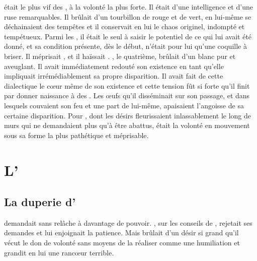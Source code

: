 \Ogo était le plus vif des \Dormus, à la volonté la plus forte. Il était d'une intelligence et d'une ruse remarquables. Il brûlait d'un tourbillon de rouge et de vert, en lui-même se déchainaient des tempêtes et il conservait en lui le chaos originel, indompté et tempétueux. Parmi les \Dormus, il était le seul à saisir le potentiel de ce qui lui avait été donné, et sa condition présente, dès le début, n'était pour lui qu'une coquille à briser. Il méprisait \Boromu, et il haïssait \Tot. \Tot, le quatrième, brûlait d'un blanc pur et aveuglant. Il avait immédiatement redouté son existence en tant qu'elle impliquait irrémédiablement sa propre disparition. Il avait fait de cette dialectique le cœur même de son existence et cette tension fût si forte qu'il finit par donner naissance à des \SC. Les œufs qu'il disséminait sur son passage, et dans lesquels couvaient son feu et une part de lui-même, apaisaient l'angoisse de sa certaine disparition. Pour \Ogo, dont les désirs fleurissaient inlassablement le long de murs qui ne demandaient plus qu'à être abattus, \Tot était la volonté en mouvement sous sa forme la plus pathétique et méprisable. 


\section{L'\Extinction}

\subsection{La duperie d'\Ogo}

 \Ogo demandait sans relâche à \Mey davantage de pouvoir. \Mey, sur les conseils de \Cind, rejetait ses demandes et lui enjoignait la patience. Mais \Ogo brûlait d'un désir si grand qu'il vécut le don de volonté sans moyens de la réaliser comme une humiliation et grandit en lui une rancœur terrible.  
 
